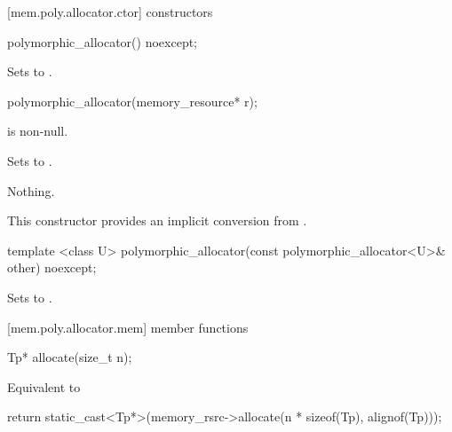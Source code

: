 [mem.poly.allocator.ctor]{ constructors}

%
\begin{itemdecl}
polymorphic_allocator() noexcept;
\end{itemdecl}

\begin{itemdescr}
\pnum
\effects
Sets  to .
\end{itemdescr}

%
\begin{itemdecl}
polymorphic_allocator(memory_resource* r);
\end{itemdecl}

\begin{itemdescr}
\pnum
\requires
{} is non-null.

\pnum
\effects
Sets  to .

\pnum
\throws
Nothing.

\pnum
\begin{note}
This constructor provides an implicit conversion from .
\end{note}
\end{itemdescr}

%
\begin{itemdecl}
template <class U>
  polymorphic_allocator(const polymorphic_allocator<U>& other) noexcept;
\end{itemdecl}

\begin{itemdescr}
\pnum
\effects
Sets  to .
\end{itemdescr}


[mem.poly.allocator.mem]{ member functions}

%
\begin{itemdecl}
Tp* allocate(size_t n);
\end{itemdecl}

\begin{itemdescr}
\pnum
\returns
Equivalent to
\begin{codeblock}
return static_cast<Tp*>(memory_rsrc->allocate(n * sizeof(Tp), alignof(Tp)));
\end{codeblock}
\end{itemdescr}

